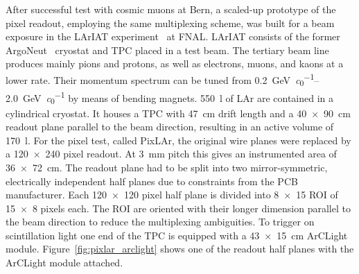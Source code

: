 \documentclass[a4paper]{article}
\begin{document}
After successful test with cosmic muons at Bern, a scaled-up prototype of the pixel readout, employing the same multiplexing scheme, was built for a beam exposure in the LArIAT experiment~\cite{lariat} at FNAL.
LArIAT consists of the former ArgoNeut~\cite{argoneut} cryostat and TPC placed in a test beam.
The tertiary beam line produces mainly pions and protons, as well as electrons, muons, and kaons at a lower rate.
Their momentum spectrum can be tuned from \SIrange{0.2}{2.0}{\giga\electronvolt\per\clight} by means of bending magnets.
\SI{550}{\litre} of LAr are contained in a cylindrical cryostat.
It houses a TPC with \SI{47}{\centi\metre} drift length and a \SI{40 x 90}{\centi\metre} readout plane parallel to the beam direction, resulting in an active volume of \SI{170}{\litre}.
For the pixel test, called PixLAr, the original wire planes were replaced by a \num{120 x 240} pixel readout.
At \SI{3}{\milli\metre} pitch this gives an instrumented area of \SI{36 x 72}{\centi\metre}.
The readout plane had to be split into two mirror-symmetric, electrically independent half planes due to constraints from the PCB manufacturer.
Each \num{120 x 120} pixel half plane is divided into \num{8 x 15} ROI of \num{15 x 8} pixels each.
The ROI are oriented with their longer dimension parallel to the beam direction to reduce the multiplexing ambiguities.
To trigger on scintillation light one end of the TPC is equipped with a \SI{43 x 15}{\centi\metre} ArCLight module. 
Figure~\ref{fig:pixlar_arclight} shows one of the readout half planes with the ArCLight module attached.
\end{document}
